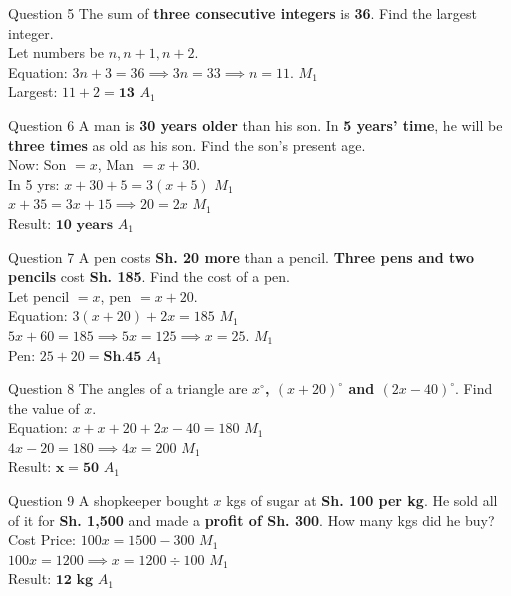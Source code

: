 \documentclass[12pt, a4paper, oneside]{article}
\begin{document}
\begin{solvingbox}{Question 5}
The sum of \textbf{three consecutive integers} is \textbf{36}. Find the largest integer. \\
Let numbers be $n, n+1, n+2$. \\
Equation: $3n + 3 = 36 \implies 3n = 33 \implies n = 11$. \hfill $M_1$ \\
Largest: $11 + 2 = \mathbf{13}$ \hfill $A_1$
\end{solvingbox}

\begin{solvingbox}{Question 6}
A man is \textbf{30 years older} than his son. In \textbf{5 years' time}, he will be \textbf{three times} as old as his son. Find the son's present age. \\
Now: Son $= x$, Man $= x + 30$. \\
In 5 yrs: $x + 30 + 5 = 3(x + 5)$ \hfill $M_1$ \\
$x + 35 = 3x + 15 \implies 20 = 2x$ \hfill $M_1$ \\
Result: $\mathbf{10\text{ years}}$ \hfill $A_1$
\end{solvingbox}

\begin{solvingbox}{Question 7}
A pen costs \textbf{Sh. 20 more} than a pencil. \textbf{Three pens and two pencils} cost \textbf{Sh. 185}. Find the cost of a pen. \\
Let pencil $= x$, pen $= x + 20$. \\
Equation: $3(x + 20) + 2x = 185$ \hfill $M_1$ \\
$5x + 60 = 185 \implies 5x = 125 \implies x = 25$. \hfill $M_1$ \\
Pen: $25 + 20 = \mathbf{Sh. 45}$ \hfill $A_1$
\end{solvingbox}

\begin{solvingbox}{Question 8}
The angles of a triangle are \textbf{$x^\circ$, $(x + 20)^\circ$ and $(2x - 40)^\circ$}. Find the value of $x$. \\
Equation: $x + x + 20 + 2x - 40 = 180$ \hfill $M_1$ \\
$4x - 20 = 180 \implies 4x = 200$ \hfill $M_1$ \\
Result: $\mathbf{x = 50}$ \hfill $A_1$
\end{solvingbox}

\begin{solvingbox}{Question 9}
A shopkeeper bought $x$ kgs of sugar at \textbf{Sh. 100 per kg}. He sold all of it for \textbf{Sh. 1,500} and made a \textbf{profit of Sh. 300}. How many kgs did he buy? \\
Cost Price: $100x = 1500 - 300$ \hfill $M_1$ \\
$100x = 1200 \implies x = 1200 \div 100$ \hfill $M_1$ \\
Result: $\mathbf{12\text{ kg}}$ \hfill $A_1$
\end{solvingbox}
\end{document}
